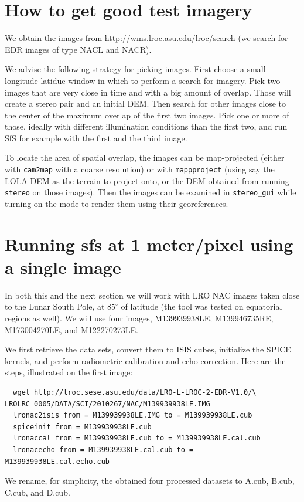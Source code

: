 \section{How to get good test imagery}

We obtain the images from
\url{http://wms.lroc.asu.edu/lroc/search} (we search for EDR images of
type NACL and NACR). 

We advise the following strategy for picking images. First choose a small
longitude-latidue window in which to perform a search for imagery. Pick
two images that are very close in time and with a big amount of overlap.
Those will create a stereo pair and an initial DEM. Then search for 
other images close to the center of the maximum overlap of the first
two images. Pick one or more of those, ideally with different illumination
conditions than the first two, and run SfS for example with the first
and the third image. 

To locate the area of spatial overlap, the images can be map-projected (either
with \texttt{cam2map} with a coarse resolution) or with \texttt{mappproject}
(using say the LOLA DEM as the terrain to project onto, or the DEM obtained
from running \texttt{stereo} on those images). Then the images can be examined
in \texttt{stereo\_gui} while turning on the mode to render them using their
georeferences.

\section{Running sfs at 1 meter/pixel using a single image}

In both this and the next section we will work with LRO NAC images taken
close to the Lunar South Pole, at $85^\circ$ of latitude (the tool was
tested on equatorial regions as well). We will use four images,
M139939938LE, M139946735RE, M173004270LE, and M122270273LE.

We first retrieve the data sets, convert them to ISIS cubes, initialize
the SPICE kernels, and perform radiometric calibration and echo
correction. Here are the steps, illustrated on the first image:
\begin{verbatim}
  wget http://lroc.sese.asu.edu/data/LRO-L-LROC-2-EDR-V1.0/\
LROLRC_0005/DATA/SCI/2010267/NAC/M139939938LE.IMG
  lronac2isis from = M139939938LE.IMG to = M139939938LE.cub
  spiceinit from = M139939938LE.cub
  lronaccal from = M139939938LE.cub to = M139939938LE.cal.cub
  lronacecho from = M139939938LE.cal.cub to = M139939938LE.cal.echo.cub
\end{verbatim}
We rename, for simplicity, the obtained four processed datasets to
A.cub, B.cub, C.cub, and D.cub.

